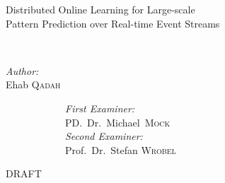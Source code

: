\begin{titlepage}
\begin{center}
			{ \Large \bfseries 

				Distributed Online Learning for Large-scale  \\Pattern Prediction over Real-time Event Streams}\\[2.9cm]
			
			\begin{minipage}[t]{0.4\textwidth}
				\begin{flushleft} \large
					\emph{Author:}\\
					Ehab \textsc{Qadah}
				\end{flushleft}
			\end{minipage}
			\begin{minipage}[t]{0.5\textwidth}
				\begin{flushleft} \large
					~~~~~~~~~~~~\emph{First Examiner:} \\
					~~~~~~~~~~~~PD.~Dr.~Michael~\textsc{Mock} \\[0.5cm]
					~~~~~~~~~~~~\emph{Second Examiner:} \\
					~~~~~~~~~~~~Prof.~Dr.~Stefan \textsc{Wrobel} \\[0.5cm]
					
				\end{flushleft}
			\end{minipage}
			
			\vfill
			
			{\large DRAFT}
		\end{center}
	\end{titlepage}